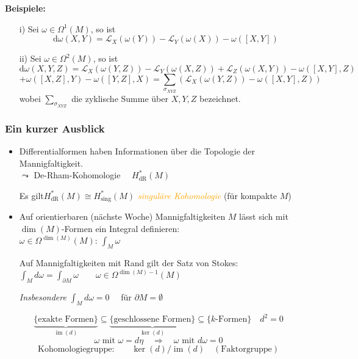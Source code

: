 \documentclass[fleqn, 12pt, letterpaper]{article}
\newcommand{\txt}[1]{\text{#1}}
\begin{document}
\textbf{Beispiele:}
\begin{itemize}
  \item[i)] Sei \( \omega \in \Omega^1(M) \), so ist
  \[
  \mathrm{d}\omega(X, Y) = \mathcal{L}_X(\omega(Y)) - \mathcal{L}_Y(\omega(X)) - \omega([X, Y])
  \]
  
  \item[ii)] Sei \( \omega \in \Omega^2(M) \), so ist
  \[
  \mathrm{d}\omega(X, Y, Z) = \mathcal{L}_X(\omega(Y, Z)) 
 - \mathcal{L}_Y(\omega(X, Z)) 
 + \mathcal{L}_Z(\omega(X, Y)) - \omega([X, Y], Z) 
 \] 
 \[
 + \omega([X, Z], Y) 
 - \omega([Y, Z], X) =\sum_{\sigma_{XYZ}} 
  \left( \mathcal{L}_X(\omega(Y, Z)) - \omega([X, Y], Z) \right)\]
  wobei \( \sum_{\sigma_{XYZ}} \) die zyklische Summe über \( X, Y, Z \) bezeichnet.
\end{itemize}

\subsubsection*{Ein kurzer Ausblick}
\begin{itemize}
    \item Differentialformen haben Informationen über die Topologie der Mannigfaltigkeit. \\
    $\leadsto$ De-Rham-Kohomologie $\quad H_{\text{dR}}^*(M)$
    
    \medskip
    Es gilt\quad $H_{\text{dR}}^*(M) \cong H_{\text{sing}}^*(M)$ \quad \textcolor{orange}{\emph{singuläre Kohomologie}} \quad (für kompakte $M$)
    
    \item Auf orientierbaren (nächste Woche) Mannigfaltigkeiten $M$ lässt sich mit $\dim(M)$-Formen ein Integral definieren: \\
    $\omega \in \Omega^{\dim(M)}(M)$: \quad $\displaystyle \int_M \omega$
    
    \medskip
    Auf Mannigfaltigkeiten mit Rand gilt der Satz von Stokes: \\
    $\displaystyle \int_M d\omega = \int_{\partial M} \omega \qquad \omega \in \Omega^{\dim(M)-1}(M)$
    
    \medskip
    \textit{Insbesondere} \quad $\displaystyle \int_M d\omega = 0 \quad$ für $\partial M = \emptyset$
\end{itemize}
\[
\underbrace{\{ \text{exakte Formen} \}}_{\operatorname{im}(d)} 
\subseteq 
\underbrace{\{ \text{geschlossene Formen} \}}_{\operatorname{ker}(d)} 
\subseteq 
\{ \text{$k$-Formen} \}    \quad d^2=0
\]
\[
\omega \text{ mit } \omega = d\eta 
\quad \Rightarrow \quad
\omega \text{ mit } d\omega = 0
\]
\[
\text{Kohomologiegruppe:} \qquad \ker(d)/\operatorname{im}(d) \quad (\txt{Faktorgruppe})
\]
\end{document}
